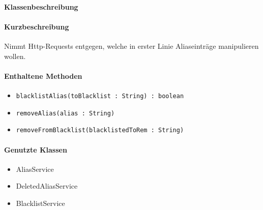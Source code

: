 \paragraph*{Klassenbeschreibung}%
\paragraph*{Kurzbeschreibung}
Nimmt Http-Requests entgegen, welche in erster Linie Aliaseinträge manipulieren wollen.
\paragraph*{Enthaltene Methoden}
\begin{itemize}
    \item \texttt{blacklistAlias(toBlacklist : String) : boolean}
    \item \texttt{removeAlias(alias : String)}
    \item \texttt{removeFromBlacklist(blacklistedToRem : String)}
\end{itemize}
\paragraph*{Genutzte Klassen}
\begin{itemize}
    \item AliasService
    \item DeletedAliasService
    \item BlacklistService
\end{itemize}